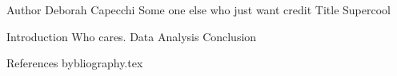 Author 	Deborah Capecchi Some one else who just want credit
Title	Supercool


Introduction Who cares.
Data
Analysis
Conclusion

References
bybliography.tex
